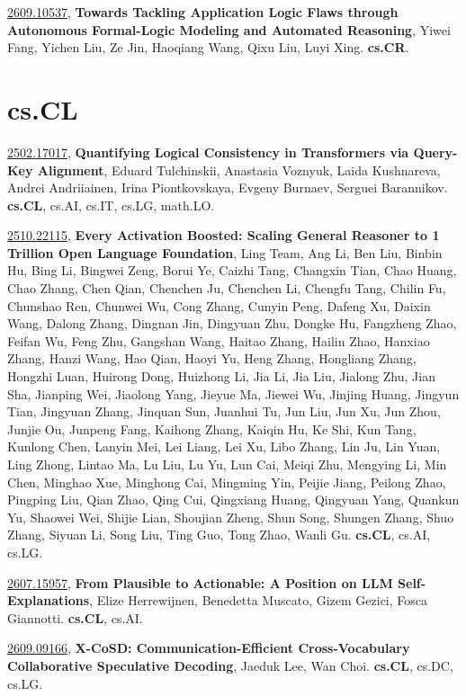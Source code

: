 \documentclass[9pt, a4paper]{article}
\theoremstyle{plain}
\theoremstyle{definition}
\theoremstyle{remark}
\newcommand{\arxivwithtarget}[3]{\hypertarget{#1}{}\href{https://arxiv.org/abs/#1}{#1}, \textbf{\textcolor{arxivblue}{#2}}, #3. }
\begin{document}
\arxivwithtarget{2609.10537}{Towards Tackling Application Logic Flaws through Autonomous Formal-Logic Modeling and Automated Reasoning}{Yiwei Fang, Yichen Liu, Ze Jin, Haoqiang Wang, Qixu Liu, Luyi Xing}\textbf{cs.CR}.



\section{cs.CL}
\arxivwithtarget{2502.17017}{Quantifying Logical Consistency in Transformers via Query-Key Alignment}{Eduard Tulchinskii, Anastasia Voznyuk, Laida Kushnareva, Andrei Andriiainen, Irina Piontkovskaya, Evgeny Burnaev, Serguei Barannikov}\textbf{cs.CL}, cs.AI, cs.IT, cs.LG, math.LO.



\arxivwithtarget{2510.22115}{Every Activation Boosted: Scaling General Reasoner to 1 Trillion Open Language Foundation}{Ling Team, Ang Li, Ben Liu, Binbin Hu, Bing Li, Bingwei Zeng, Borui Ye, Caizhi Tang, Changxin Tian, Chao Huang, Chao Zhang, Chen Qian, Chenchen Ju, Chenchen Li, Chengfu Tang, Chilin Fu, Chunshao Ren, Chunwei Wu, Cong Zhang, Cunyin Peng, Dafeng Xu, Daixin Wang, Dalong Zhang, Dingnan Jin, Dingyuan Zhu, Dongke Hu, Fangzheng Zhao, Feifan Wu, Feng Zhu, Gangshan Wang, Haitao Zhang, Hailin Zhao, Hanxiao Zhang, Hanzi Wang, Hao Qian, Haoyi Yu, Heng Zhang, Hongliang Zhang, Hongzhi Luan, Huirong Dong, Huizhong Li, Jia Li, Jia Liu, Jialong Zhu, Jian Sha, Jianping Wei, Jiaolong Yang, Jieyue Ma, Jiewei Wu, Jinjing Huang, Jingyun Tian, Jingyuan Zhang, Jinquan Sun, Juanhui Tu, Jun Liu, Jun Xu, Jun Zhou, Junjie Ou, Junpeng Fang, Kaihong Zhang, Kaiqin Hu, Ke Shi, Kun Tang, Kunlong Chen, Lanyin Mei, Lei Liang, Lei Xu, Libo Zhang, Lin Ju, Lin Yuan, Ling Zhong, Lintao Ma, Lu Liu, Lu Yu, Lun Cai, Meiqi Zhu, Mengying Li, Min Chen, Minghao Xue, Minghong Cai, Mingming Yin, Peijie Jiang, Peilong Zhao, Pingping Liu, Qian Zhao, Qing Cui, Qingxiang Huang, Qingyuan Yang, Quankun Yu, Shaowei Wei, Shijie Lian, Shoujian Zheng, Shun Song, Shungen Zhang, Shuo Zhang, Siyuan Li, Song Liu, Ting Guo, Tong Zhao, Wanli Gu}\textbf{cs.CL}, cs.AI, cs.LG.



\arxivwithtarget{2607.15957}{From Plausible to Actionable: A Position on LLM Self-Explanations}{Elize Herrewijnen, Benedetta Muscato, Gizem Gezici, Fosca Giannotti}\textbf{cs.CL}, cs.AI.



\arxivwithtarget{2609.09166}{X-CoSD: Communication-Efficient Cross-Vocabulary Collaborative Speculative Decoding}{Jaeduk Lee, Wan Choi}\textbf{cs.CL}, cs.DC, cs.LG.
\end{document}
